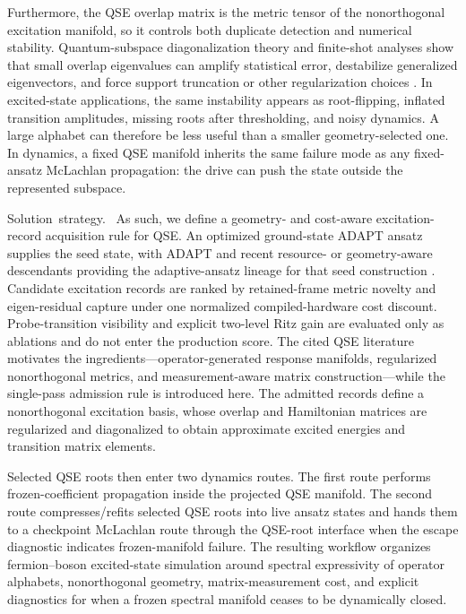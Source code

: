 \documentclass[
  reprint,
  amsmath,
  amssymb,
  aps,
  pra,
  nofootinbib,
  superscriptaddress,
  floatfix
]{revtex4-2}
\newcommand{\tentative}[1]{\textcolor{red!70!black}{#1}}
\newcommand{\structlabel}[1]{\noindent\mbox{\tentative{#1.}}~}
\begin{document}
Furthermore, the QSE overlap matrix is the metric tensor of the nonorthogonal excitation manifold, so it controls both duplicate detection and numerical stability.  Quantum-subspace diagonalization theory and finite-shot analyses show that small overlap eigenvalues can amplify statistical error, destabilize generalized eigenvectors, and force support truncation or other regularization choices \cite{Epperly2022QSD,Lee2024SamplingQKSD,Getelina2024HardwareNoiseQSE,OLeary2025PartitionedQSE,Kwao2026GEPQSE}.  In excited-state applications, the same instability appears as root-flipping, inflated transition amplitudes, missing roots after thresholding, and noisy dynamics.  A large alphabet can therefore be less useful than a smaller geometry-selected one.  In dynamics, a fixed QSE manifold inherits the same failure mode as any fixed-ansatz McLachlan propagation: the drive can push the state outside the represented subspace.

\structlabel{Solution strategy}
As such, we define a geometry- and cost-aware excitation-record acquisition rule for QSE.  An optimized ground-state ADAPT ansatz supplies the seed state, with ADAPT and recent resource- or geometry-aware descendants providing the adaptive-ansatz lineage for that seed construction \cite{Grimsley2019ADAPT,Tang2021QubitADAPT,Anastasiou2024TETRIS,Ramoa2025CEO,Sohail2026GeoADAPT}.  Candidate excitation records are ranked by retained-frame metric novelty and eigen-residual capture under one normalized compiled-hardware cost discount.  Probe-transition visibility and explicit two-level Ritz gain are evaluated only as ablations and do not enter the production score.  The cited QSE literature motivates the ingredients---operator-generated response manifolds, regularized nonorthogonal metrics, and measurement-aware matrix construction---while the single-pass admission rule is introduced here.  The admitted records define a nonorthogonal excitation basis, whose overlap and Hamiltonian matrices are regularized and diagonalized to obtain approximate excited energies and transition matrix elements.

Selected QSE roots then enter two dynamics routes.  The first route performs frozen-coefficient propagation inside the projected QSE manifold.  The second route compresses/refits selected QSE roots into live ansatz states and hands them to a checkpoint McLachlan route through the QSE-root interface when the escape diagnostic indicates frozen-manifold failure.  The resulting workflow organizes fermion--boson excited-state simulation around spectral expressivity of operator alphabets, nonorthogonal geometry, matrix-measurement cost, and explicit diagnostics for when a frozen spectral manifold ceases to be dynamically closed.
\end{document}
